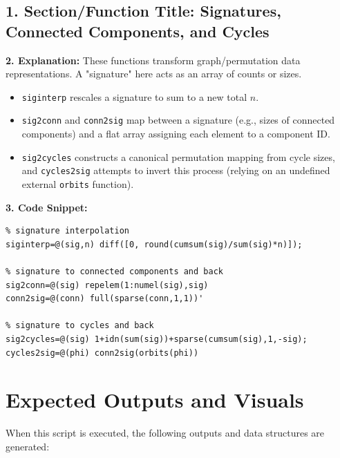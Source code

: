 \subsection{1. Section/Function Title: Signatures, Connected Components, and Cycles}
\textbf{2. Explanation:} These functions transform graph/permutation data representations. A "signature" here acts as an array of counts or sizes. 
\begin{itemize}
    \item \texttt{siginterp} rescales a signature to sum to a new total $n$.
    \item \texttt{sig2conn} and \texttt{conn2sig} map between a signature (e.g., sizes of connected components) and a flat array assigning each element to a component ID.     \item \texttt{sig2cycles} constructs a canonical permutation mapping from cycle sizes, and \texttt{cycles2sig} attempts to invert this process (relying on an undefined external \texttt{orbits} function).
\end{itemize}

\textbf{3. Code Snippet:}
\begin{lstlisting}
% signature interpolation
siginterp=@(sig,n) diff([0, round(cumsum(sig)/sum(sig)*n)]);

% signature to connected components and back
sig2conn=@(sig) repelem(1:numel(sig),sig)
conn2sig=@(conn) full(sparse(conn,1,1))' 

% signature to cycles and back
sig2cycles=@(sig) 1+idn(sum(sig))+sparse(cumsum(sig),1,-sig);
cycles2sig=@(phi) conn2sig(orbits(phi))
\end{lstlisting}

\section{Expected Outputs and Visuals}

When this script is executed, the following outputs and data structures are generated:

